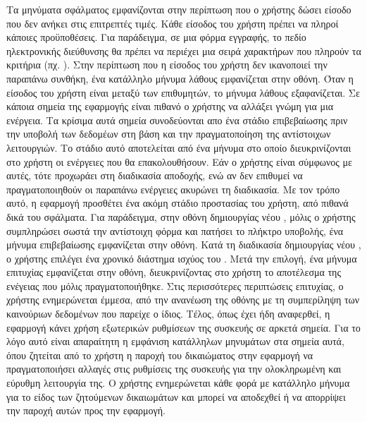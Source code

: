 Τα μηνύματα σφάλματος εμφανίζονται στην περίπτωση που ο χρήστης δώσει είσοδο που δεν ανήκει στις επιτρεπτές τιμές. Κάθε είσοδος του χρήστη πρέπει να πληροί κάποιες προϋποθέσεις. Για παράδειγμα, σε μια φόρμα εγγραφής, το πεδίο ηλεκτρονικής διεύθυνσης θα πρέπει να περιέχει μια σειρά χαρακτήρων που πληρούν τα κριτήρια (πχ. ). Στην περίπτωση που η είσοδος του χρήστη δεν ικανοποιεί την παραπάνω συνθήκη, ένα κατάλληλο μήνυμα λάθους εμφανίζεται στην οθόνη. Όταν η είσοδος του χρήστη είναι μεταξύ των επιθυμητών, το μήνυμα λάθους εξαφανίζεται.
\newline \indent
Σε κάποια σημεία της εφαρμογής είναι πιθανό ο χρήστης να αλλάξει γνώμη για μια ενέργεια. Τα κρίσιμα αυτά σημεία συνοδεύονται απο ένα στάδιο επιβεβαίωσης πριν την υποβολή των δεδομέων στη βάση και την πραγματοποίηση της αντίστοιχων λειτουργιών. Το στάδιο αυτό αποτελείται από ένα μήνυμα στο οποίο διευκρινίζονται στο χρήστη οι ενέργειες που θα επακολουθήσουν. Εάν ο χρήστης είναι σύμφωνος με αυτές, τότε προχωράει στη διαδικασία αποδοχής, ενώ αν δεν επιθυμεί να πραγματοποιηθούν οι παραπάνω ενέργειες ακυρώνει τη διαδικασία. Με τον τρόπο αυτό, η εφαρμογή προσθέτει ένα ακόμη στάδιο προστασίας του χρήστη, από πιθανά δικά του σφάλματα. Για παράδειγμα, στην οθόνη δημιουργίας νέου , μόλις ο χρήστης συμπληρώσει σωστά την αντίστοιχη φόρμα και πατήσει το πλήκτρο υποβολής, ένα μήνυμα επιβεβαίωσης εμφανίζεται στην οθόνη. 
\newline \indent
Κατά τη διαδικασία δημιουργίας νέου , ο χρήστης επιλέγει ένα χρονικό διάστημα ισχύος του . Μετά την επιλογή, ένα μήνυμα επιτυχίας εμφανίζεται στην οθόνη, διευκρινίζοντας στο χρήστη το αποτέλεσμα της ενέγειας που μόλις πραγματοποιήθηκε. Στις περισσότερες περιπτώσεις επιτυχίας, ο χρήστης ενημερώνεται έμμεσα, από την ανανέωση της οθόνης με τη συμπερίληψη των καινούριων δεδομένων που παρείχε ο ίδιος.
\newline \indent
Τέλος, όπως έχει ήδη αναφερθεί, η εφαρμογή κάνει χρήση εξωτερικών ρυθμίσεων της συσκευής σε αρκετά σημεία. Για το λόγο αυτό είναι απαραίτητη η εμφάνιση κατάλληλων μηνυμάτων στα σημεία αυτά, όπου ζητείται από το χρήστη η παροχή του δικαιώματος στην εφαρμογή να πραγματοποιήσει αλλαγές στις ρυθμίσεις της συσκευής για την ολοκληρωμένη και εύρυθμη λειτουργία της. Ο χρήστης ενημερώνεται κάθε φορά με κατάλληλο μήνυμα για το είδος των ζητούμενων δικαιωμάτων και μπορεί να αποδεχθεί ή να απορρίψει την παροχή αυτών προς την εφαρμογή.


